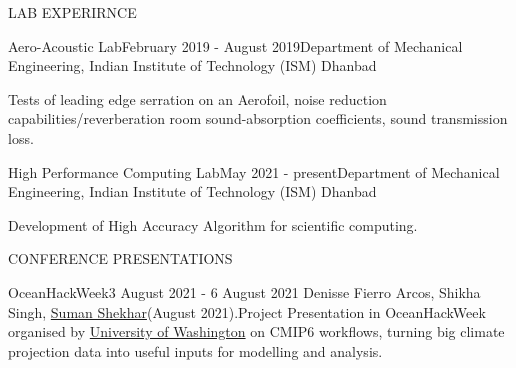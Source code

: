 \documentclass{resume} %
\begin{document}
\begin{rSection}{LAB EXPERIRNCE}

\begin{rSubsection}{Aero-Acoustic Lab}{February 2019 - August 2019}{Department of Mechanical Engineering, Indian Institute of Technology (ISM) Dhanbad}
\item Tests of leading edge serration on an Aerofoil, noise reduction capabilities/reverberation room sound-absorption coefficients, sound transmission loss.
\end{rSubsection}

\begin{rSubsection}{High Performance Computing Lab}{May 2021 - present}{Department of Mechanical Engineering, Indian Institute of Technology (ISM) Dhanbad}
\item Development of High Accuracy Algorithm for scientific computing.
\end{rSubsection}

\end{rSection}

\begin{rSection}{CONFERENCE PRESENTATIONS}
\begin{rSubsection}{OceanHackWeek}{3 August 2021 - 6 August 2021}{}
Denisse Fierro Arcos, Shikha Singh, \underline{Suman Shekhar}(August 2021).Project Presentation in OceanHackWeek organised by \underline{University of Washington}  on CMIP6 workflows, turning big climate projection data into useful inputs for modelling and analysis.
\end{rSubsection}
\end{rSection}
\end{document}
